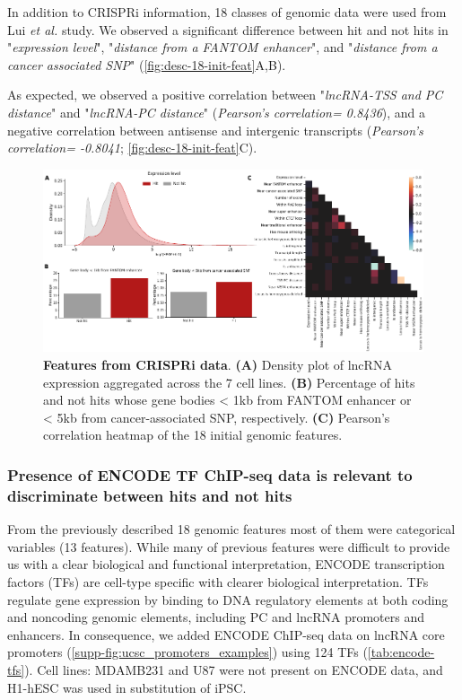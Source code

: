 In addition to CRISPRi information, 18 classes of genomic data were used from Lui \textit{et al.}\autocite{liu_2017_crispri} study. We observed a significant difference between hit and not hits in "\textit{expression level}", "\textit{distance from a FANTOM enhancer}", and "\textit{distance from a cancer associated SNP}" (\autoref{fig:desc-18-init-feat}A,B).

As expected, we observed a positive correlation between "\textit{lncRNA-TSS and PC distance}" and "\textit{lncRNA-PC distance}" (\textit{Pearson’s correlation= 0.8436}), and a negative correlation between antisense and intergenic transcripts (\textit{Pearson’s correlation= -0.8041}; \autoref{fig:desc-18-init-feat}C).

\begin{figure}[ht!]
  \centering
  \includegraphics[scale=0.75]{plots/results/ml/18.variables.pdf}
  \caption[Features from CRISPRi data]{\textbf{Features from CRISPRi data}. \textbf{(A)} Density plot of lncRNA expression aggregated across the 7 cell lines. \textbf{(B)} Percentage of hits and not hits whose gene bodies < 1kb from FANTOM enhancer or < 5kb from cancer-associated SNP, respectively. \textbf{(C)} Pearson’s correlation heatmap of the 18 initial genomic features.}
  \label{fig:desc-18-init-feat}
\end{figure}

\subsubsection{Presence of ENCODE TF ChIP-seq data is relevant to discriminate between hits and not hits}
\label{sub-sec:encode-data}

From the previously described 18 genomic features most of them were categorical variables (13 features).  While many of previous features\autocite{liu_2017_crispri} were difficult to provide us with a clear biological and functional interpretation, ENCODE transcription factors\autocite{encode_2004,encode_2011_user} (TFs) are cell-type specific with clearer biological interpretation. TFs regulate gene expression by binding to DNA regulatory elements at both coding and noncoding genomic elements, including PC and lncRNA promoters and enhancers.\autocite{mattioli_2019} In consequence, we added ENCODE ChIP-seq data on lncRNA core promoters (\autoref{supp-fig:ucsc_promoters_examples}) using 124 TFs (\autoref{tab:encode-tfs}). Cell lines: MDAMB231 and U87 were not present on ENCODE data, and H1-hESC was used in substitution of iPSC.

